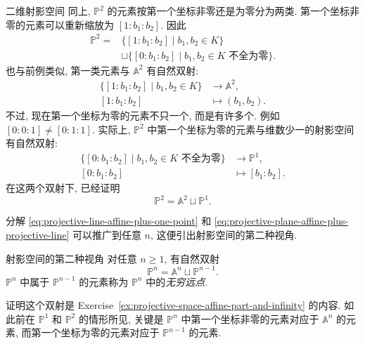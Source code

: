 \begin{Example}{二维射影空间}\leavevmode\label{ex:two-dimensional-projective-space}
同上, $\mathbb{P}^{2}$ 的元素按第一个坐标非零还是为零分为两类. 第一个坐标非零的元素可以重新缩放为 $[1:b_{1}:b_{2}]$. 因此
\[
  \begin{aligned}
    \mathbb{P}^{2}={}&\{[1:b_{1}:b_{2}]\mid b_{1},b_{2}\in K\}\\
      &\sqcup\{[0:b_{1}:b_{2}]\mid b_{1},b_{2}\in K\text{ 不全为零}\}.
  \end{aligned}
\]
也与前例类似, 第一类元素与 $\mathbb{A}^{2}$ 有自然双射:
\[
  \begin{aligned}
    \{[1:b_{1}:b_{2}]\mid b_{1},b_{2}\in K\}&\to\mathbb{A}^{2},\\
    [1:b_{1}:b_{2}]&\mapsto(b_{1},b_{2}).
  \end{aligned}
\]
不过, 现在第一个坐标为零的元素不只一个, 而是有许多个. 例如 $[0:0:1]\neq[0:1:1]$. 实际上, $\mathbb{P}^{2}$ 中第一个坐标为零的元素与维数少一的射影空间有自然双射:
\[
  \begin{aligned}
    \{[0:b_{1}:b_{2}]\mid b_{1},b_{2}\in K\text{ 不全为零}\}&\to\mathbb{P}^{1},\\
    [0:b_{1}:b_{2}]&\mapsto[b_{1}:b_{2}].
  \end{aligned}
\]
在这两个双射下, 已经证明
\begin{equation}\label{eq:projective-plane-affine-plus-projective-line}
  \mathbb{P}^{2}=\mathbb{A}^{2}\sqcup\mathbb{P}^{1}.
\end{equation}
\end{Example}

分解 \eqref{eq:projective-line-affine-plus-one-point} 和 \eqref{eq:projective-plane-affine-plus-projective-line} 可以推广到任意 $n$, 这便引出射影空间的第二种视角.

\begin{Proposition}{射影空间的第二种视角}\leavevmode\label{prop:projective-space-affine-plus-infinity}
对任意 $n\geq1$, 有自然双射
\[
  \mathbb{P}^{n}=\mathbb{A}^{n}\sqcup\mathbb{P}^{n-1}.
\]
$\mathbb{P}^{n}$ 中属于 $\mathbb{P}^{n-1}$ 的元素称为 $\mathbb{P}^{n}$ 中的\emph{无穷远点}.
\end{Proposition}

证明这个双射是 Exercise~\ref{ex:projective-space-affine-part-and-infinity} 的内容. 如此前在 $\mathbb{P}^{1}$ 和 $\mathbb{P}^{2}$ 的情形所见, 关键是 $\mathbb{P}^{n}$ 中第一个坐标非零的元素对应于 $\mathbb{A}^{n}$ 的元素, 而第一个坐标为零的元素对应于 $\mathbb{P}^{n-1}$ 的元素.

